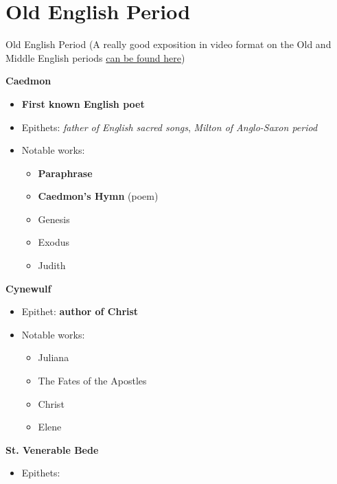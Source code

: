 \documentclass[
  12pt,
    progressbar=frametitle]{beamer}
\providecommand{\tightlist}{%
  \setlength{\itemsep}{0pt}\setlength{\parskip}{0pt}}
\begin{document}
\section{Old English Period}
\begin{frame}[allowframebreaks]
{Old English Period}
\footnotesize(A really good exposition in video format on the Old and
Middle English periods
\href{https://youtu.be/sYLopdePO2A}{can be found here}) \normalsize

\large\textbf{Caedmon}\normalsize\vspace{-3mm}

\begin{itemize}
\tightlist
\item
  \textbf{First known English poet}
\item
  Epithets: \emph{father of English sacred songs}, \emph{Milton of
  Anglo-Saxon period}
\item
  Notable works:

  \begin{itemize}
  \tightlist
  \item
    \textbf{Paraphrase}
  \item
    \textbf{Caedmon's Hymn} (poem)
  \item
    Genesis
  \item
    Exodus
  \item
    Judith
  \end{itemize}
\end{itemize}

\large\textbf{Cynewulf}\normalsize\vspace{-3mm}

\begin{itemize}
\tightlist
\item
  Epithet: \textbf{author of Christ}
\item
  Notable works:

  \begin{itemize}
  \tightlist
  \item
    Juliana
  \item
    The Fates of the Apostles
  \item
    Christ
  \item
    Elene
  \end{itemize}
\end{itemize}

\large\textbf{St. Venerable Bede}\normalsize\vspace{-3mm}

\begin{itemize}
\tightlist
\item
  Epithets:


\end{itemize}
\end{frame}
\end{document}
